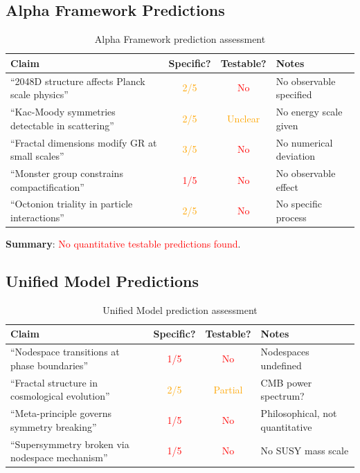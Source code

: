 \subsection{Alpha Framework Predictions}

\begin{table}[H]
\centering
\footnotesize
\begin{tabular}{p{5cm}ccp{3cm}}
\toprule
\textbf{Claim} & \textbf{Specific?} & \textbf{Testable?} & \textbf{Notes} \\
\midrule
``2048D structure affects Planck scale physics'' & \textcolor{orange}{2/5} & \textcolor{red}{No} & No observable specified \\
``Kac-Moody symmetries detectable in scattering'' & \textcolor{orange}{2/5} & \textcolor{orange}{Unclear} & No energy scale given \\
``Fractal dimensions modify GR at small scales'' & \textcolor{orange}{3/5} & \textcolor{red}{No} & No numerical deviation \\
``Monster group constrains compactification'' & \textcolor{red}{1/5} & \textcolor{red}{No} & No observable effect \\
``Octonion triality in particle interactions'' & \textcolor{orange}{2/5} & \textcolor{red}{No} & No specific process \\
\bottomrule
\end{tabular}
\caption{Alpha Framework prediction assessment}
\end{table}

\textbf{Summary}: \textcolor{red}{No quantitative testable predictions found}.

\subsection{Unified Model Predictions}

\begin{table}[H]
\centering
\footnotesize
\begin{tabular}{p{5cm}ccp{3cm}}
\toprule
\textbf{Claim} & \textbf{Specific?} & \textbf{Testable?} & \textbf{Notes} \\
\midrule
``Nodespace transitions at phase boundaries'' & \textcolor{red}{1/5} & \textcolor{red}{No} & Nodespaces undefined \\
``Fractal structure in cosmological evolution'' & \textcolor{orange}{2/5} & \textcolor{orange}{Partial} & CMB power spectrum? \\
``Meta-principle governs symmetry breaking'' & \textcolor{red}{1/5} & \textcolor{red}{No} & Philosophical, not quantitative \\
``Supersymmetry broken via nodespace mechanism'' & \textcolor{red}{1/5} & \textcolor{red}{No} & No SUSY mass scale \\
\bottomrule
\end{tabular}
\caption{Unified Model prediction assessment}
\end{table}

